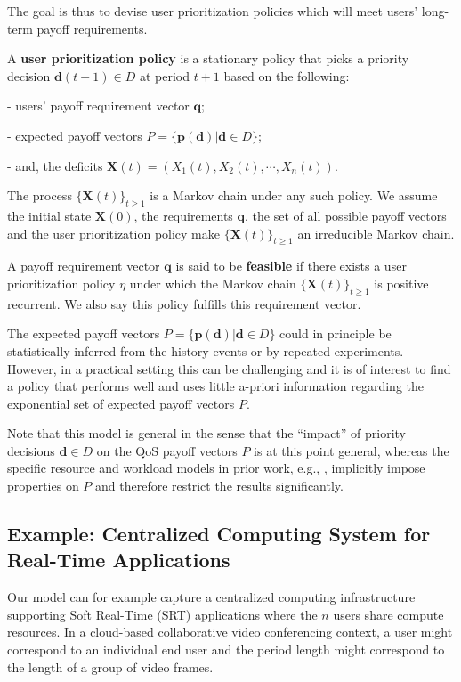 \documentclass[prodmode,acmtompecs]{acmsmall}
\newcommand{\reqvec}{\mathbf{q}}
\begin{document}
The goal is thus to devise user prioritization policies which will meet users' long-term payoff requirements. 

\begin{definition}
A {\bf user prioritization policy} is a stationary policy that picks a priority decision $\mathbf{d}(t+1) \in D$ at period $t+1$ based on the following:
\begin{longitem}
\item[-] users' payoff requirement vector $\reqvec$; 
\item[-] expected payoff vectors $P = \{\mathbf{p}(\mathbf{d}) | \mathbf{d} \in D\}$; 
\item[-] and, the deficits $\mathbf{X}(t) = (X_1(t), X_2(t), \cdots, X_n(t))$. 
\end{longitem}
\end{definition}

The process $\{\mathbf{X}(t)\}_{t\geq 1}$ is a Markov chain under any such policy. We assume the initial state $\mathbf{X}(0)$, the requirements $\reqvec$, the set of all possible payoff vectors and the user prioritization policy make $\{\mathbf{X}(t)\}_{t\geq 1}$ an irreducible Markov chain. 

\begin{definition}
\label{defn_feasibility_pr}
A payoff requirement vector $\reqvec$ is said to be {\bf feasible} if there exists a user prioritization policy $\eta$ under which the Markov chain $\{\mathbf{X}(t)\}_{t\geq 1}$ is positive recurrent. We also say this policy fulfills this requirement vector. 
\end{definition}

The expected payoff vectors $P = \{\mathbf{p}(\mathbf{d}) | \mathbf{d} \in D\}$ could in principle be statistically inferred from the history events or by repeated experiments. 
However, in a practical setting this can be challenging and it is of interest to find a policy that performs well and uses little a-priori information regarding the exponential set of expected payoff vectors $P$. 

Note that this model is general in the sense that the ``impact'' of priority decisions $\mathbf{d} \in D$ on the QoS payoff vectors $P$ is at this point general, whereas the specific resource and workload models in prior work, e.g., \cite{DiW06,JLS07,KWJ13}, implicitly impose properties on $P$ and therefore restrict the results significantly. 

\subsection{Example: Centralized Computing System for Real-Time Applications}
\label{subsection_SRT_model}
Our model can for example capture a centralized computing infrastructure supporting Soft Real-Time (SRT) applications where the $n$ users share compute resources. In a cloud-based collaborative video conferencing context, a user might correspond to an individual end user and the period length might correspond to the length of a group of video frames. 
\end{document}
